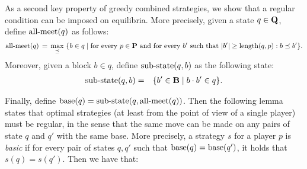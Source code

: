 %
%
%
%
%
%
%



As a second key property of greedy combined strategies, we show that a regular condition can be imposed on equilibria. More precisely, given a state $q \in \mathbf{Q}$, define $\text{\rm all-meet}(q)$ as follows:
\begin{multline*}
\text{\rm all-meet}(q)  \, =  \, \max_{\preceq} \ \{b \in q \mid \text{for every } p\in \mathbf{P} \text{ and for every } b' \text{ such that } |b'| \geq \text{\rm length}(q,p): b \preceq b'\}. 
\end{multline*}
Moreover, given a block $b \in q$, define ${\text{\rm sub-state}}(q,b)$ as the following state:
\begin{eqnarray*}
{\text{\rm sub-state}}(q,b) & = & \{ b' \in \mathbf{B} \mid b \cdot b' \in q\}.
\end{eqnarray*}

Finally, define $\text{\rm base}(q) = {\text{\rm sub-state}}(q,\text{\rm all-meet}(q))$.
Then the following lemma states that optimal strategies (at least from the point of view of a single player) must be regular, in the sense that the same move can be made on any pairs of state $q$ and $q'$ with the same base. More precisely, 
a strategy $s$ for a player $p$ is \emph{basic} if for every pair of states $q, q'$ such that $\text{\rm base}(q) = \text{\rm base}(q')$, it holds that $s(q) = s(q')$. Then we have that:

